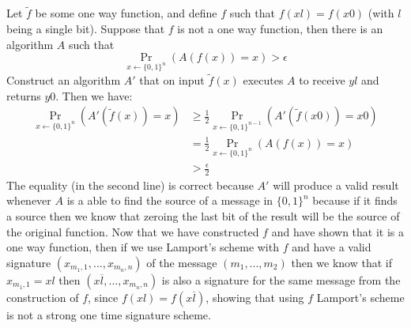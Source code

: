 \documentclass{article}
\begin{document}
\section{}%
Let $\tilde{f}$ be some one way function, and define $f$ such that $f(xl) = f(x0)$ (with $l$ being a single bit).
Suppose that $f$ is not a one way function, then there is an algorithm $A$ such that 
\[\Pr_{x\leftarrow \{0,1\}^n}(A(f(x)) = x) > \epsilon\]
Construct an algorithm $A'$ that on input $\tilde{f}(x)$ executes $A$ to receive $yl$ and returns $y0$.
Then we have:
\begin{align*}
\Pr_{x\leftarrow \{0,1\}^n}(A'(\tilde{f}(x)) = x) &\geq \frac{1}{2}\Pr_{x\leftarrow \{0,1\}^{n-1}}(A'(\tilde{f}(x0)) = x0)\\
&= \frac{1}{2}\Pr_{x\leftarrow \{0,1\}^{n}}(A(f(x)) = x)\\
&>\frac{\epsilon}{2}
\end{align*}
The equality (in the second line) is correct because $A'$ will produce a valid result whenever $A$ is a able to find the source of a message in $\{0,1\}^{n}$ because if it finds a source then we know that zeroing the last bit of the result will be the source of the original function.
Now that we have constructed $f$ and have shown that it is a one way function, then if we use Lamport’s scheme with $f$ and have a valid signature $(x_{m_1, 1}, ..., x_{m_n, n})$ of the message $(m_1, ... , m_2)$ then we know that if $x_{m_1, 1} = xl$ then  $(x\overline{l}, ..., x_{m_n, n})$ is also a signature for the same message from the construction of $f$, since $f(xl) = f(x\overline{l})$, showing that using $f$ Lamport’s scheme is not a strong one time signature scheme.

\section{}%

\section{}%
\subsection{}%

\subsection{}%

\section{}%

\section{}%
\subsection{}%

\subsection{}%
\end{document}
